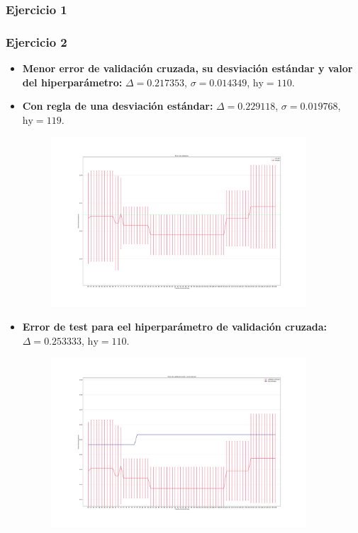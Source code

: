 \documentclass[11pt]{article}
\begin{document}
\subsubsection*{Ejercicio 1}

\subsubsection*{Ejercicio 2}

\begin{itemize}
    \item \textbf{Menor error de validación cruzada, su desviación estándar y valor del hiperparámetro:} $\Delta = 0.217353$, $\sigma = 0.014349$, $\text{hy} = 110$.
    \item \textbf{Con regla de una desviación estándar:} $\Delta = 0.229118$, $\sigma = 0.019768$, $\text{hy} = 119$.
    \begin{figure}[H]
    \centering
    \includegraphics[width=0.9\textwidth]{fotos/ej2_1.pdf}
    \end{figure}
    \item \textbf{Error de test para eel hiperparámetro de validación cruzada:} $\Delta = 0.253333$, $\text{hy} = 110$.
    \begin{figure}[H]
    \centering
    \includegraphics[width=0.9\textwidth]{fotos/ej2_2.pdf}
    \end{figure}
\end{itemize}
\end{document}
